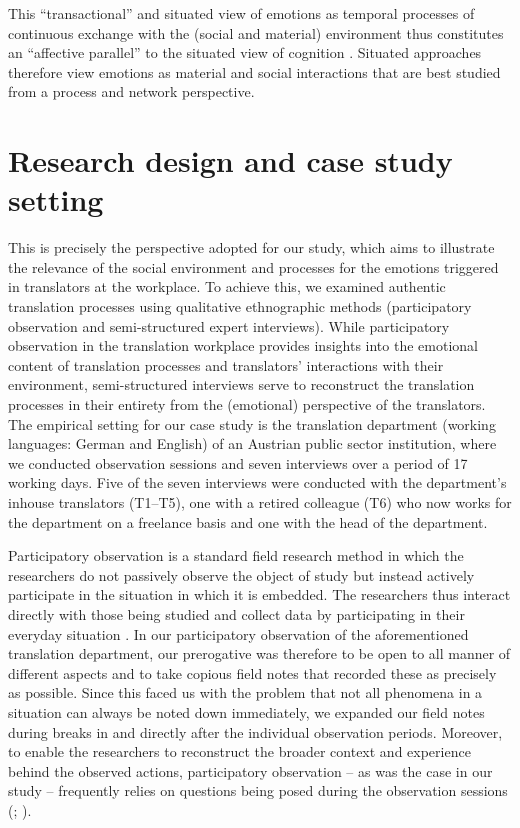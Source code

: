 \documentclass[output=paper]{langscibook}
\begin{document}
This “transactional” and situated view of emotions as temporal processes of continuous exchange with the (social and material) environment thus constitutes an “affective parallel” to the situated view of cognition \citep[438]{Griffiths2009}. Situated approaches therefore view emotions as material and social interactions that are best studied from a process and network perspective.

\section{Research design and case study setting}
This is precisely the perspective adopted for our study, which aims to illustrate the relevance of the social environment and processes for the emotions triggered in translators at the workplace. To achieve this, we examined authentic translation processes using qualitative ethnographic methods (participatory observation and semi-structured expert interviews). While participatory observation in the translation workplace provides insights into the emotional content of translation processes and translators’ interactions with their environment, semi-structured interviews serve to reconstruct the translation processes in their entirety from the (emotional) perspective of the translators. The empirical setting for our case study is the translation department (working languages: German and English) of an Austrian public sector institution, where we conducted observation sessions and seven interviews over a period of 17 working days. Five of the seven interviews were conducted with the department’s inhouse translators (T1--T5), one with a retired colleague (T6) who now works for the department on a freelance basis and one with the head of the department.

Participatory observation is a standard field research method in which the researchers do not passively observe the object of study but instead actively participate in the situation in which it is embedded. The researchers thus interact directly with those being studied and collect data by participating in their everyday situation \citep[80]{Mayring2002}. In our participatory observation of the aforementioned translation department, our prerogative was therefore to be open to all manner of different aspects and to take copious field notes that recorded these as precisely as possible. Since this faced us with the problem that not all phenomena in a situation can always be noted down immediately, we expanded our field notes during breaks in and directly after the individual observation periods. Moreover, to enable the researchers to reconstruct the broader context and experience behind the observed actions, participatory observation -- as was the case in our study -- frequently relies on questions being posed during the observation sessions (\citealp[82]{Mayring2002}; \citealp[295]{Flick2002}).
\end{document}
